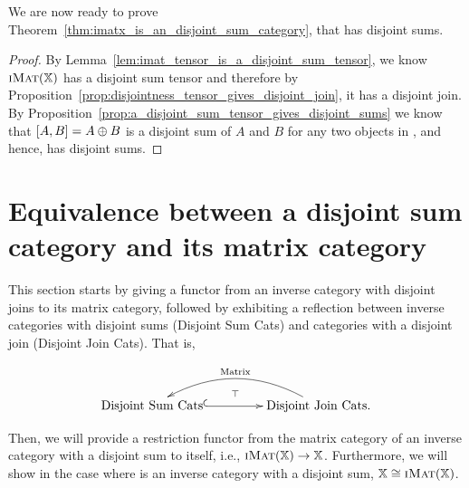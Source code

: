 We are now ready to prove Theorem~\ref{thm:imatx_is_an_disjoint_sum_category}, that \imatx has
disjoint sums.

\begin{proof}
  By Lemma~\ref{lem:imat_tensor_is_a_disjoint_sum_tensor}, we know $\textsc{iMat}({\mathbb{X}})$ has a disjoint sum
  tensor and therefore by Proposition~\ref{prop:disjointness_tensor_gives_disjoint_join},
  it has a disjoint join. By Proposition~\ref{prop:a_disjoint_sum_tensor_gives_disjoint_sums}
  we know that $[A,B] = A\oplus B$ is a disjoint sum of $A$ and $B$ for any two objects in \imatx, and
  hence, \imatx has disjoint sums.
\end{proof}

\section{Equivalence between a disjoint sum category and its matrix category} %
\label{sec:equivalence_between_an_disjoint_sum_category_and_its_matrix_category}
This section starts by giving a functor from an inverse category with disjoint joins to its matrix
category, followed by exhibiting a reflection between inverse categories with disjoint sums
(Disjoint Sum Cats) and categories with a disjoint join (Disjoint Join Cats). That is,

\begin{equation}
   \xymatrix@R+10pt@C+20pt{
     \text{Disjoint Sum Cats} \ar@{^{(}->}[r]
     & \text{Disjoint Join Cats.} \ar@/_1.8pc/[l]_{\text{Matrix}} \ar@{}@<-1ex>[l]_{\top}
   }\label{fig:disjoint-sum-cats-to-disjoint-join-cats}
\end{equation}

Then, we will provide a restriction functor from the matrix category of an inverse category with a
disjoint sum to itself, i.e., $\textsc{iMat}({\mathbb{X}}) \to \mathbb{X}$.  Furthermore, we will show in the case where \X is an
inverse category with a disjoint sum, $\mathbb{X}\cong \textsc{iMat}({\mathbb{X}})$.

